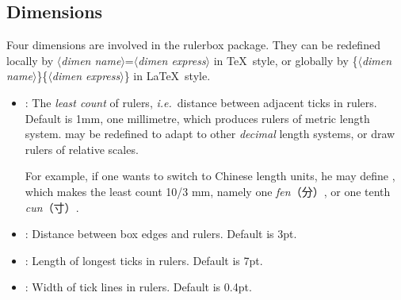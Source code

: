 \documentclass[a4paper,11pt]{article}
\def\lan{\ensuremath{\langle}}
\def\ran{\ensuremath{\rangle}}
\def\param#1{\textrm{\lan\textit{#1}\ran}}
\def\texttt#1{{\ttfamily\color{darkmiku}#1}}
\begin{document}
\subsection{Dimensions}
	Four dimensions are involved in the \textsf{rulerbox} package. They can be redefined locally by \texttt{\param{dimen name}=\param{dimen express}\string\relax} in \TeX\ style, or globally by \texttt{\string\setlength\{\param{dimen name}\}\{\param{dimen express}\}} in \LaTeX\ style.
		\begin{itemize}
			\item \texttt{\string{}}: The \textsl{least count} of rulers, \textit{i.e.}\ distance between adjacent ticks in rulers. Default is \texttt{1mm}, one millimetre, which produces rulers of metric length system. \texttt{\string{}} may be redefined to adapt to other \textsl{decimal} length systems, or draw rulers of relative scales.\par
			For example, if one wants to switch to Chinese length units, he may define \texttt{\string{}\string\divide\string{}\string\relax}, which makes the least count 10/3 mm, namely one \textit{fen}{（分）}\kern-4pt, or one tenth \textit{cun}{（寸）}\kern-4pt.\par
			\vskip-6mm
			\hbox{}\hfill{\divide{}\relax{}}\hfill\hbox{}\par
			\smallskip
			\item \texttt{\string{}}: Distance between box edges and rulers. Default is \texttt{3pt}.
			\item \texttt{\string{}}: Length of longest ticks in rulers. Default is \texttt{7pt}.
			\item \texttt{\string\rtickrule}: Width of tick lines in rulers. Default is \texttt{0.4pt}.
		\end{itemize}
		
\end{document}
